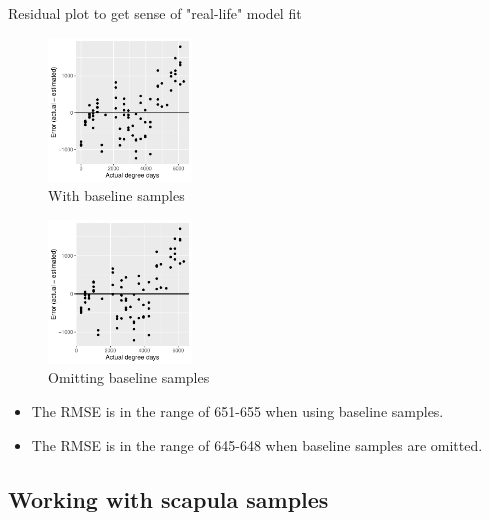 \documentclass{beamer}
\begin{document}
\begin{frame}{Residual plot to get sense of "real-life" model fit}

  \begin{minipage}{0.47\textwidth}
  \begin{figure}
      \includegraphics[width=1.5in]{RiceRivers/bacteria/use_families/w_ribs/w_baseline/leave_out_one_rib_and_one_day_residuals}
      \caption{With baseline samples}
  \end{figure}
  \end{minipage}  
  \begin{minipage}{0.47\textwidth}
  \begin{figure}
      \includegraphics[width=1.5in]{RiceRivers/bacteria/use_families/w_ribs/no_baseline/leave_out_one_rib_and_one_day_residuals}
      \caption{Omitting baseline samples}
  \end{figure}
  \end{minipage}
    \vspace{0.1in}
{\scriptsize
  \begin{itemize}
  \item The RMSE is in the range of 651-655 when using baseline samples.
  \item The RMSE is in the range of 645-648 when baseline samples are omitted.
  \end{itemize}
}

\end{frame}



\subsection[Scapulae]{Working with scapula samples}
\end{document}

